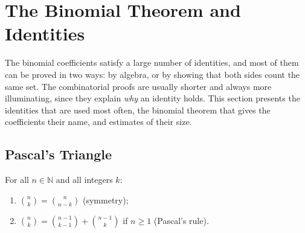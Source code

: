 \begin{table}
\end{table}

\section{The Binomial Theorem and Identities}
\label{sec:binomial}

The binomial coefficients satisfy a large number of identities, and most of them can be proved in two ways: by algebra, or by showing that both sides count the same set. The combinatorial proofs are usually shorter and always more illuminating, since they explain \emph{why} an identity holds. This section presents the identities that are used most often, the binomial theorem that gives the coefficients their name, and estimates of their size.

\subsection{Pascal's Triangle}

\begin{proposition}
\label{prop:pascal}
For all $n\in\mathbb N$ and all integers $k$:
\begin{enumerate}
\item $\binom nk=\binom n{n-k}$ \quad(symmetry);
\item $\binom nk=\binom{n-1}{k-1}+\binom{n-1}{k}$ if $n\ge1$ \quad(Pascal's rule).
\end{enumerate}
\end{proposition}

